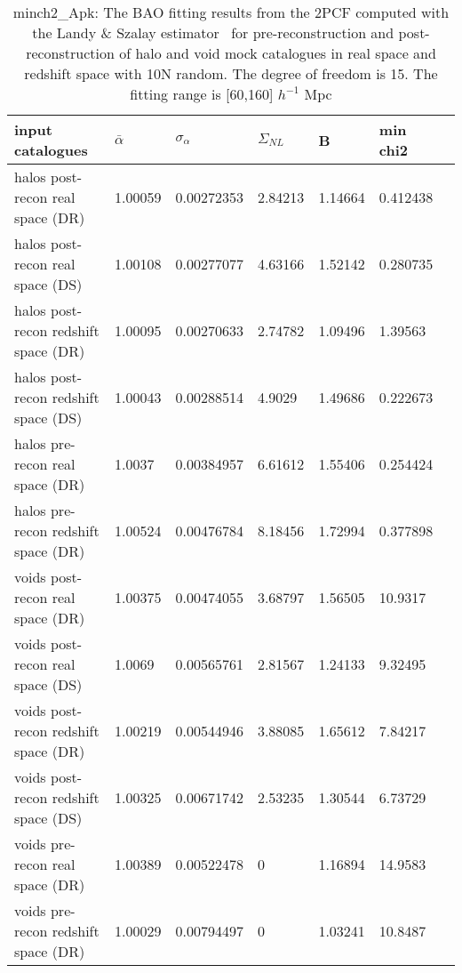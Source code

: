 \begin{table*}
\caption{minch2_Apk: The BAO fitting results from the 2PCF computed with the Landy $\&$ Szalay estimator~\cite{Landy1993} for pre-reconstruction and  post-reconstruction of halo and void mock catalogues in real space and redshift space with 10N random. The degree of freedom is 15. The fitting range is [60,160] $h^{-1}$ Mpc}
\label{tab:LS}
\begin{tabular}{lllllll}
\hline
input catalogues &  $\bar{\alpha}$ &  $\sigma_{\alpha}$ &       $\Sigma_{NL}$ &        B &  min chi2 \\
\hline
halos post-recon real space (DR)     & 1.00059 & 0.00272353 & 2.84213 & 1.14664 & 0.412438 \\
halos post-recon real space (DS)     & 1.00108 & 0.00277077 & 4.63166 & 1.52142 & 0.280735 \\
halos post-recon redshift space (DR) & 1.00095 & 0.00270633 & 2.74782 & 1.09496 & 1.39563  \\
halos post-recon redshift space (DS) & 1.00043 & 0.00288514 & 4.9029  & 1.49686 & 0.222673 \\
halos pre-recon real space (DR)      & 1.0037  & 0.00384957 & 6.61612 & 1.55406 & 0.254424 \\
halos pre-recon redshift space (DR)  & 1.00524 & 0.00476784 & 8.18456 & 1.72994 & 0.377898 \\
\hline
voids post-recon real space (DR)     & 1.00375 & 0.00474055 & 3.68797 & 1.56505 & 10.9317  \\
voids post-recon real space (DS)     & 1.0069  & 0.00565761 & 2.81567 & 1.24133 & 9.32495  \\
voids post-recon redshift space (DR) & 1.00219 & 0.00544946 & 3.88085 & 1.65612 & 7.84217  \\
voids post-recon redshift space (DS) & 1.00325 & 0.00671742 & 2.53235 & 1.30544 & 6.73729  \\
voids pre-recon real space (DR)      & 1.00389 & 0.00522478 & 0       & 1.16894 & 14.9583  \\
voids pre-recon redshift space (DR)  & 1.00029 & 0.00794497 & 0       & 1.03241 & 10.8487  \\
\hline
\end{tabular}
\end{table*}

